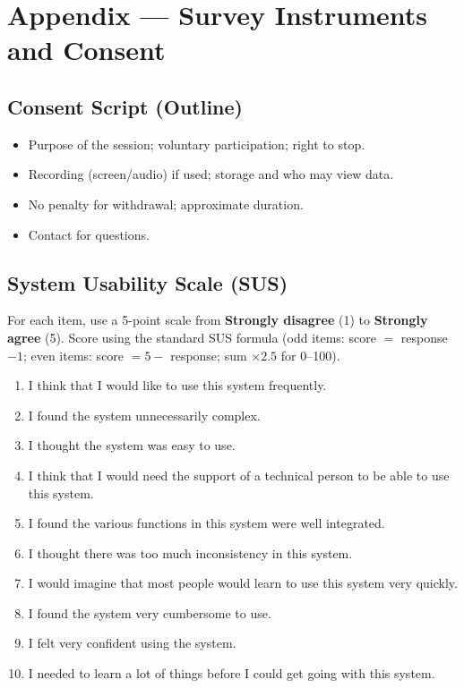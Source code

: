 \newpage{}

\label{sec:appendix}

\section*{Appendix --- Survey Instruments and Consent}

\subsection*{Consent Script (Outline)}

\begin{itemize}
  \item Purpose of the session; voluntary participation; right to stop.
  \item Recording (screen/audio) if used; storage and who may view data.
  \item No penalty for withdrawal; approximate duration.
  \item Contact for questions.
\end{itemize}

\subsection*{System Usability Scale (SUS)}

For each item, use a 5-point scale from \textbf{Strongly disagree} (1) to \textbf{Strongly agree} (5). Score using the standard SUS formula (odd items: score $= $ response $- 1$; even items: score $= 5 - $ response; sum $\times 2.5$ for 0--100).

\begin{enumerate}
  \item I think that I would like to use this system frequently.
  \item I found the system unnecessarily complex.
  \item I thought the system was easy to use.
  \item I think that I would need the support of a technical person to be able to use this system.
  \item I found the various functions in this system were well integrated.
  \item I thought there was too much inconsistency in this system.
  \item I would imagine that most people would learn to use this system very quickly.
  \item I found the system very cumbersome to use.
  \item I felt very confident using the system.
  \item I needed to learn a lot of things before I could get going with this system.
\end{enumerate}

